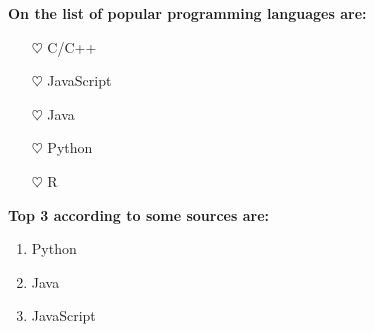 \endgroup
\setlength{\parindent}{30pt}



\par
\textbf{\large On the list of popular programming languages are:}
\begin{itemize}
    \item[$\heartsuit$] C/C++
    \item[$\heartsuit$] JavaScript
    \item[$\heartsuit$] Java
    \item[$\heartsuit$] Python
    \item[$\heartsuit$] R
\end{itemize}


\textbf{\large Top 3 according to some sources are:}
\begin{enumerate}
  \item Python
  \item Java
  \item JavaScript
\end{enumerate}